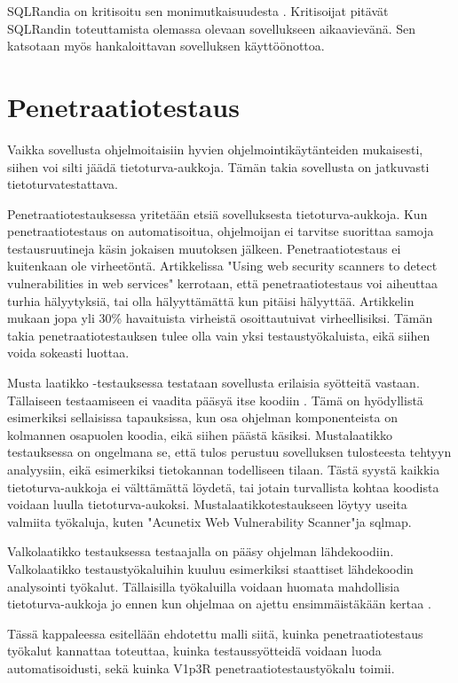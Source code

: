 \documentclass[finnish]{tktltiki2}
\theoremstyle{definition}
\theoremstyle{remark}
\begin{document}
	SQLRandia on kritisoitu sen monimutkaisuudesta \cite{prepared}. Kritisoijat pitävät SQLRandin toteuttamista olemassa olevaan sovellukseen aikaavievänä. Sen katsotaan myös hankaloittavan sovelluksen käyttöönottoa.
	\section{Penetraatiotestaus}
	
	 Vaikka sovellusta ohjelmoitaisiin hyvien ohjelmointikäytänteiden mukaisesti, siihen voi silti jäädä tietoturva-aukkoja. Tämän takia sovellusta on jatkuvasti tietoturvatestattava. 
	 
	 Penetraatiotestauksessa yritetään etsiä sovelluksesta tietoturva-aukkoja. Kun penetraatiotestaus on automatisoitua, ohjelmoijan ei tarvitse suorittaa samoja testausruutineja käsin jokaisen muutoksen jälkeen. Penetraatiotestaus ei kuitenkaan ole virheetöntä. Artikkelissa "Using web security scanners to detect vulnerabilities in web services" \cite{detection} kerrotaan, että penetraatiotestaus voi aiheuttaa turhia hälyytyksiä, tai olla hälyyttämättä kun pitäisi hälyyttää. Artikkelin mukaan jopa yli 30\% havaituista virheistä osoittautuivat virheellisiksi. Tämän takia penetraatiotestauksen tulee olla vain yksi testaustyökaluista, eikä siihen voida sokeasti luottaa.
	 
	Musta laatikko -testauksessa testataan sovellusta erilaisia syötteitä vastaan. Tällaiseen testaamiseen ei vaadita pääsyä itse koodiin \cite{testing2}. Tämä on hyödyllistä esimerkiksi sellaisissa tapauksissa, kun osa ohjelman komponenteista on kolmannen osapuolen koodia, eikä siihen päästä käsiksi. Mustalaatikko testauksessa on ongelmana se, että tulos perustuu sovelluksen tulosteesta tehtyyn analyysiin, eikä esimerkiksi tietokannan todelliseen tilaan. Tästä syystä kaikkia tietoturva-aukkoja ei välttämättä löydetä, tai jotain turvallista kohtaa koodista voidaan luulla tietoturva-aukoksi. Mustalaatikkotestaukseen löytyy useita valmiita työkaluja, kuten "Acunetix Web Vulnerability Scanner"\space ja sqlmap.
	
	Valkolaatikko testauksessa testaajalla on pääsy ohjelman lähdekoodiin. Valkolaatikko testaustyökaluihin kuuluu esimerkiksi staattiset lähdekoodin analysointi työkalut. Tällaisilla työkaluilla voidaan huomata mahdollisia tietoturva-aukkoja jo ennen kun ohjelmaa on ajettu ensimmäistäkään kertaa \cite{valkolaatikko}.
	
	Tässä kappaleessa esitellään ehdotettu malli siitä, kuinka penetraatiotestaus työkalut kannattaa toteuttaa, kuinka testaussyötteidä voidaan luoda automatisoidusti, sekä kuinka V1p3R penetraatiotestaustyökalu toimii.
	
\end{document}
